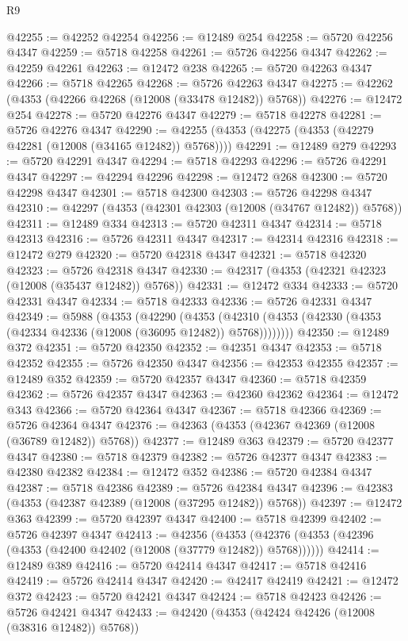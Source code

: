 \begin{lexlean}{R9}
\begin{coremodule}
@42255 := @42252 @42254
@42256 := @12489 @254
@42258 := @5720 @42256 @4347
@42259 := @5718 @42258
@42261 := @5726 @42256 @4347
@42262 := @42259 @42261
@42263 := @12472 @238
@42265 := @5720 @42263 @4347
@42266 := @5718 @42265
@42268 := @5726 @42263 @4347
@42275 := @42262 (@4353 (@42266 @42268 (@12008 (@33478 @12482)) @5768))
@42276 := @12472 @254
@42278 := @5720 @42276 @4347
@42279 := @5718 @42278
@42281 := @5726 @42276 @4347
@42290 := @42255 (@4353 (@42275 (@4353 (@42279 @42281 (@12008 (@34165 @12482)) @5768))))
@42291 := @12489 @279
@42293 := @5720 @42291 @4347
@42294 := @5718 @42293
@42296 := @5726 @42291 @4347
@42297 := @42294 @42296
@42298 := @12472 @268
@42300 := @5720 @42298 @4347
@42301 := @5718 @42300
@42303 := @5726 @42298 @4347
@42310 := @42297 (@4353 (@42301 @42303 (@12008 (@34767 @12482)) @5768))
@42311 := @12489 @334
@42313 := @5720 @42311 @4347
@42314 := @5718 @42313
@42316 := @5726 @42311 @4347
@42317 := @42314 @42316
@42318 := @12472 @279
@42320 := @5720 @42318 @4347
@42321 := @5718 @42320
@42323 := @5726 @42318 @4347
@42330 := @42317 (@4353 (@42321 @42323 (@12008 (@35437 @12482)) @5768))
@42331 := @12472 @334
@42333 := @5720 @42331 @4347
@42334 := @5718 @42333
@42336 := @5726 @42331 @4347
@42349 := @5988
    (@4353
      (@42290
        (@4353 (@42310 (@4353 (@42330 (@4353 (@42334 @42336 (@12008 (@36095 @12482)) @5768))))))))
@42350 := @12489 @372
@42351 := @5720 @42350
@42352 := @42351 @4347
@42353 := @5718 @42352
@42355 := @5726 @42350 @4347
@42356 := @42353 @42355
@42357 := @12489 @352
@42359 := @5720 @42357 @4347
@42360 := @5718 @42359
@42362 := @5726 @42357 @4347
@42363 := @42360 @42362
@42364 := @12472 @343
@42366 := @5720 @42364 @4347
@42367 := @5718 @42366
@42369 := @5726 @42364 @4347
@42376 := @42363 (@4353 (@42367 @42369 (@12008 (@36789 @12482)) @5768))
@42377 := @12489 @363
@42379 := @5720 @42377 @4347
@42380 := @5718 @42379
@42382 := @5726 @42377 @4347
@42383 := @42380 @42382
@42384 := @12472 @352
@42386 := @5720 @42384 @4347
@42387 := @5718 @42386
@42389 := @5726 @42384 @4347
@42396 := @42383 (@4353 (@42387 @42389 (@12008 (@37295 @12482)) @5768))
@42397 := @12472 @363
@42399 := @5720 @42397 @4347
@42400 := @5718 @42399
@42402 := @5726 @42397 @4347
@42413 := @42356
    (@4353 (@42376 (@4353 (@42396 (@4353 (@42400 @42402 (@12008 (@37779 @12482)) @5768))))))
@42414 := @12489 @389
@42416 := @5720 @42414 @4347
@42417 := @5718 @42416
@42419 := @5726 @42414 @4347
@42420 := @42417 @42419
@42421 := @12472 @372
@42423 := @5720 @42421 @4347
@42424 := @5718 @42423
@42426 := @5726 @42421 @4347
@42433 := @42420 (@4353 (@42424 @42426 (@12008 (@38316 @12482)) @5768))

\end{coremodule}
\end{lexlean}

